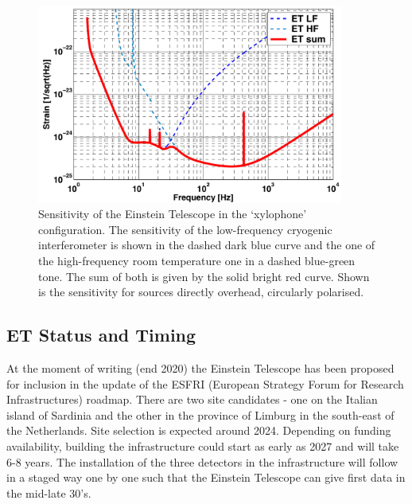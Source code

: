 \documentclass[graybox, nosecnum]{svmult}
\begin{document}
\begin{figure}[!h]
	\centering
		\includegraphics[width=0.9\textwidth]{Figures/ET_2020_spectrumtriangle.pdf}
	\caption{Sensitivity of the Einstein Telescope in the `xylophone' configuration. 
	The sensitivity of the low-frequency cryogenic interferometer is shown in the  dashed dark blue curve and the one of the high-frequency room temperature	one in a dashed blue-green tone. The sum of both is given by the solid bright red curve. Shown is the sensitivity for sources directly overhead, circularly polarised.}
	\label{fig:ET_sensitivity}
\end{figure}

\subsection{ET Status and Timing}
At the moment of writing (end 2020) the Einstein Telescope has been proposed for inclusion in the update of the ESFRI (European Strategy Forum for Research Infrastructures) roadmap. There are two site candidates - one on the Italian island of Sardinia and the other in the province of Limburg in the south-east of the Netherlands. Site selection is expected around 2024. Depending on funding availability, building the infrastructure could start as early as 2027 and will take 6-8 years. The installation of the three detectors in the infrastructure will follow in a staged way one by one such that the Einstein Telescope can give first data in the mid-late 30's.
\end{document}
